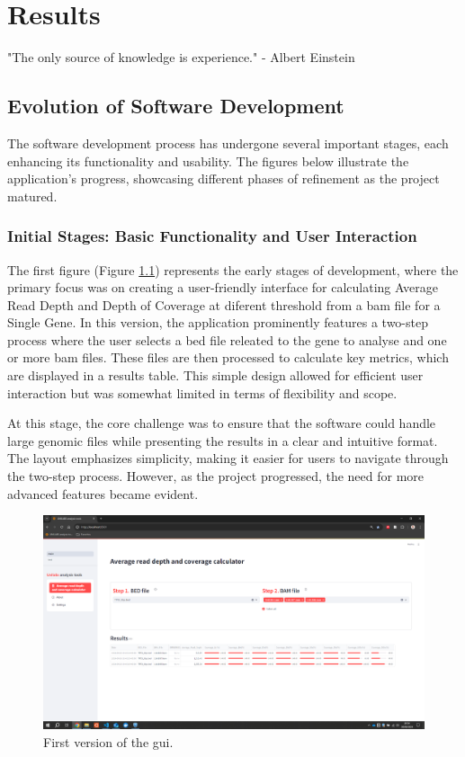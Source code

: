 \chapter{Results}
\label{chapter:Results}

\begin{introduction}
    "The only source of knowledge is experience." - Albert Einstein
\end{introduction}

\section{Evolution of Software Development}

The software development process has undergone several important stages, each enhancing its functionality and usability. The figures below illustrate the application's progress, showcasing different phases of refinement as the project matured.

\subsection{Initial Stages: Basic Functionality and User Interaction}

The first figure (Figure \ref{fig:v1}) represents the early stages of development, where the primary focus was on creating a user-friendly interface for calculating Average Read Depth and Depth of Coverage at diferent threshold from a \ac{bam} file for a Single Gene. In this version, the application prominently features a two-step process where the user selects a \ac{bed} file releated to the gene to analyse and one or more \ac{bam} files. These files are then processed to calculate key metrics, which are displayed in a results table. This simple design allowed for efficient user interaction but was somewhat limited in terms of flexibility and scope.

At this stage, the core challenge was to ensure that the software could handle large genomic files while presenting the results in a clear and intuitive format. The layout emphasizes simplicity, making it easier for users to navigate through the two-step process. However, as the project progressed, the need for more advanced features became evident.

\begin{figure}[H]
    \centering
    \includegraphics[width=1\textwidth]{figs/v1.png}
    \caption{First version of the \ac{gui}.} 
    \label{fig:v1}
\end{figure}

